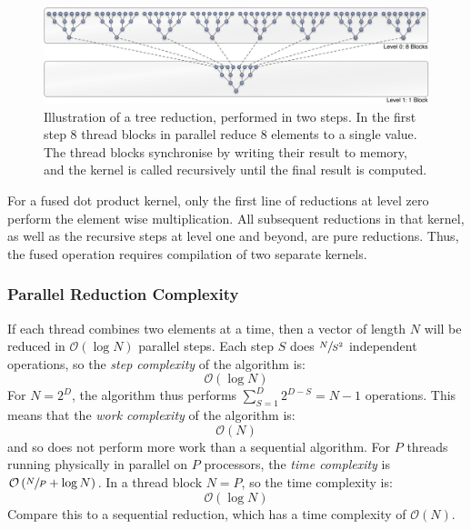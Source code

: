 \begin{figure}[htbp]
    \begin{center}
        \includegraphics[width=\textwidth]{images/sec-6/tree-reduction}
    \end{center}
    \caption[A parallel tree reduction]{Illustration of a tree reduction,
        performed in two steps. In the first step 8 thread blocks in parallel
        reduce 8 elements to a single value. The thread blocks synchronise by
        writing their result to memory, and the kernel is called recursively
        until the final result is computed.}
    \label{fig:tree_reduction}
\end{figure}

For a fused dot product kernel, only the first line of reductions at level zero
perform the element wise multiplication. All subsequent reductions in that
kernel, as well as the recursive steps at level one and beyond, are pure
reductions. Thus, the fused operation requires compilation of two separate
kernels. %

\subsubsection{Parallel Reduction Complexity}
\label{sec:parallel_complexity}

If each thread combines two elements at a time, then a vector of length $N$ will
be reduced in $\mathcal{O}\left( \log N \right)$ parallel steps. Each step $S$
does $\sfrac{N}{S^2}$ independent operations, so the \emph{step
complexity} of the algorithm is:
\[
\mathcal{O}\left( \log N \right)
\]
For $N=2^{D}$, the algorithm thus performs $\sum_{S=1}^{D}2^{D-S} = N - 1$
operations. This means that the \emph{work complexity} of
the algorithm is:
\[
\mathcal{O}\left( N \right)
\]
and so does not perform more work than a sequential algorithm. For $P$ threads
running physically in parallel on $P$ processors, the \emph{time
complexity} is $\mathcal{O}\left( \sfrac{N}{P} + \log N
\right)$. In a thread block $N = P$, so the time complexity is:
\[
\mathcal{O}\left( \log N \right)
\]
Compare this to a sequential reduction, which has a time complexity of
$\mathcal{O}\left( N \right)$.

